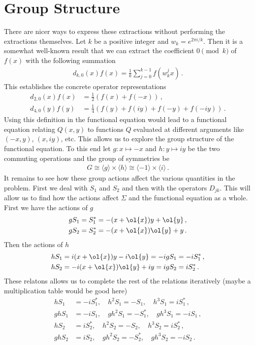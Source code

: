 \section{Group Structure}

There are nicer ways to express these extractions without performing the extractions themselves. Let $k$ be a positive integer and $w_k = e^{2\pi i/k}$. Then it is a somewhat well-known result that we can extract the coefficient $0 \pmod k$ of $f(x)$ with the following summation
\begin{align}
	d_{k,0}(x)f(x) = \frac{1}{k}\sum_{j=0}^{k-1} f(w_k^j x)\,.
\end{align}
This establishes the concrete operator representations
\begin{align}
	d_{2,0}(x)f(x) &= \frac{1}{2}(f(x) + f(-x))\,,\\
	d_{4,0}(y)f(y) &= \frac{1}{4}(f(y)+f(iy)+f(-y)+f(-iy))\,.
\end{align}
Using this definition in the functional equation would lead to a functional equation relating $Q(x,y)$ to functions $Q$ evaluated at different arguments like $(-x,y)$, $(x,iy)$, etc. This allows us to explore the group structure of the functional equation. To this end let $g: x \mapsto -x$ and $h: y \mapsto i y$ be the two commuting operations and the group of symmetries be
\begin{align}
	G \cong \langle g\rangle \times \langle h\rangle \cong \langle-1\rangle\times\langle i\rangle\,.
\end{align}
It remains to see how these group actions affect the various quantities in the problem. First we deal with $S_1$ and $S_2$ and then with the operators $D_{jk}$. This will allow us to find how the actions affect $\Sigma$ and the functional equation as a whole. First we have the actions of $g$
\begin{align}
	gS_1 &= S_1^\ast = -(x+\ol{x})y+\ol{y}\,,\\
	gS_2 &= S_2^\ast = -(x+\ol{x})\ol{y} + y\,.
\end{align}
Then the actions of $h$
\begin{align}
	hS_1 &= i(x+\ol{x})y-i\ol{y} = -igS_1 = -iS_1^\ast\,,\\
	hS_2 &= -i(x+\ol{x})\ol{y}+iy = igS_2 = iS_2^\ast\,.
\end{align}
These relatons allows us to complete the rest of the relations iteratively (maybe a multiplication table would be good here)
\begin{align*}
	hS_1 &=-iS_1^\ast,\quad h^2 S_1 = -S_1,\quad h^3 S_1 = i S_1^\ast\,,\\
	ghS_1 &=-iS_1, \quad gh^2 S_1 = -S_1^\ast,\quad gh^3 S_1 =- i S_1\,,\\
	hS_2&= iS_2^\ast,\quad h^2 S_2 = -S_2,\quad h^3 S_2 = i S_2^\ast\,,\\
	ghS_2 &= iS_2,\quad gh^2 S_2 = -S_2^\ast,\quad gh^3 S_2 = -i S_2\,.
\end{align*}
